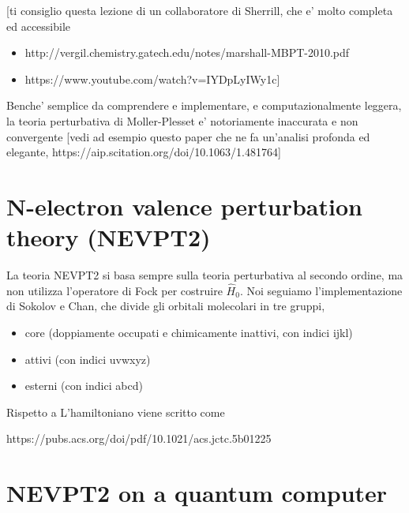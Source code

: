 \documentclass{report}
\begin{document}
[ti consiglio questa lezione di un collaboratore di Sherrill, che e' molto completa ed accessibile
\begin{itemize}
\item http://vergil.chemistry.gatech.edu/notes/marshall-MBPT-2010.pdf
\item https://www.youtube.com/watch?v=IYDpLyIWy1c]
\end{itemize}

Benche' semplice da comprendere e implementare, e computazionalmente leggera, la teoria perturbativa di Moller-Plesset
e' notoriamente inaccurata e non convergente [vedi ad esempio questo paper che ne fa un'analisi profonda ed elegante, 
https://aip.scitation.org/doi/10.1063/1.481764]

\section{N-electron valence perturbation theory (NEVPT2)}

La teoria NEVPT2 si basa sempre sulla teoria perturbativa al secondo ordine, ma non utilizza l'operatore di Fock per costruire $\hat{H}_0$. 
Noi seguiamo l'implementazione di Sokolov e Chan, che divide gli orbitali molecolari in tre gruppi,
\begin{itemize}
\item core (doppiamente occupati e chimicamente inattivi, con indici ijkl)
\item attivi (con indici uvwxyz)
\item esterni (con indici abcd)
\end{itemize}
Rispetto a
L'hamiltoniano viene scritto come 




https://pubs.acs.org/doi/pdf/10.1021/acs.jctc.5b01225


\section{NEVPT2 on a quantum computer}
\end{document}
